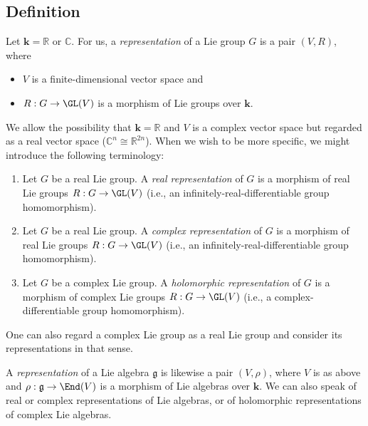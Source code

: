 \documentclass[reqno]{amsart} 
\begin{document}
\subsection{Definition}
\label{sec:org959bbb9}
\begin{definition}
  Let $\mathbf{k} = \mathbb{R}$ or $\mathbb{C}$.
  For us, a \emph{representation}
  of a Lie group $G$
  is a pair $(V,R)$,
  where
  \begin{itemize}
  \item $V$ is a finite-dimensional vector space and
  \item $R : G \rightarrow \GL(V)$ is a morphism of Lie groups over $\mathbf{k}$.
  \end{itemize}
  We allow the possibility
  that $\mathbf{k} = \mathbb{R}$
  and $V$ is a complex vector space
  but regarded as a real vector space ($\mathbb{C}^n \cong \mathbb{R}^{
    2n}$).
  When we wish to be more specific, we might introduce
  the following terminology:
  \begin{enumerate}
  \item Let $G$ be a real Lie group.
    A \emph{real representation} of $G$ is a morphism
    of real Lie groups
    $R : G \rightarrow \GL(V)$ (i.e.,
    an infinitely-real-differentiable group homomorphism).
  \item Let $G$ be a real Lie group.
    A \emph{complex representation} of $G$ is a morphism
    of real Lie groups
    $R : G \rightarrow \GL(V)$
    (i.e.,
    an infinitely-real-differentiable group homomorphism).
  \item Let $G$ be a complex Lie group.
    A \emph{holomorphic representation} of $G$ is a morphism
    of complex Lie groups
    $R : G \rightarrow \GL(V)$
    (i.e.,
    a complex-differentiable group homomorphism).
  \end{enumerate}
  One can also regard a complex Lie group as a real Lie group
  and consider its representations in that sense.

  A \emph{representation}
  of a Lie algebra $\mathfrak{g}$
  is likewise a pair $(V,\rho)$,
  where $V$ is as above
  and
  $\rho : \mathfrak{g} \rightarrow \End(V)$
  is a morphism of Lie algebras over $\mathbf{k}$.
  We can also speak of real or complex representations
  of Lie algebras, or of holomorphic representations of complex
  Lie algebras.


\end{definition}
\end{document}
